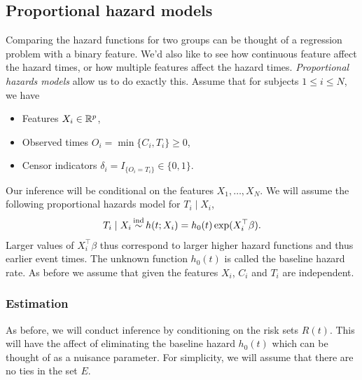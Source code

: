 \subsection{Proportional hazard models}

Comparing the hazard functions for two groups can be thought of a regression problem with a binary feature. We'd also like to see how continuous feature affect the hazard times, or how multiple features affect the hazard times. \emph{Proportional hazards models} allow us to do exactly this. Assume that for subjects $1 \le i \le N$, we have
\begin{itemize}
    \item Features $X_i \in \mathbb{R}^p$,
    \item Observed times $O_i = \min\{C_i,T_i\} \ge 0$,
    \item Censor indicators $\delta_i = I_{\{O_i = T_i\}} \in \{0,1\}$.
\end{itemize}
Our inference will be conditional on the features $X_1,\ldots,X_N$. We will assume the following proportional hazards model for $T_i \mid X_i$,
\begin{align}
    T_i\mid X_i \simind h(t;X_i) = h_0(t)\exp(X_i^\top \beta). \label{eq:prop-haz}
\end{align}
Larger values of $X_i^\top \beta$ thus correspond to larger higher hazard functions and thus earlier event times. The unknown function $h_0(t)$ is called the baseline hazard rate.
As before we assume that given the features $X_i$, $C_i$ and $T_i$ are independent. 

\subsubsection*{Estimation}

As before, we will conduct inference by conditioning on the risk sets $R(t)$. This will have the affect of eliminating the baseline hazard $h_0(t)$ which can be thought of as a nuisance parameter. For simplicity, we will assume that there are no ties in the set $E$.

